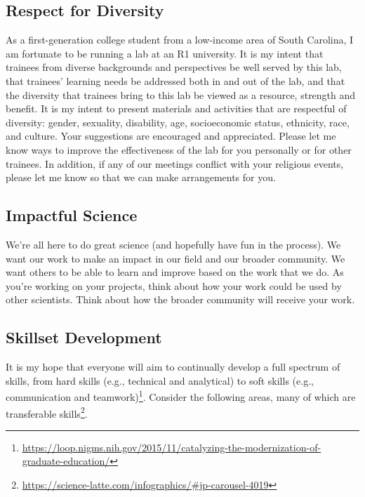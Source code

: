 \documentclass[letterpaper,11pt,oneside]{memoir}
\begin{document}
\subsection{Respect for Diversity}
As a first-generation college student from a low-income area of South Carolina, I am fortunate to be running a lab at an R1 university. It is my intent that trainees from diverse backgrounds and perspectives be well served by this lab, that trainees’ learning needs be addressed both in and out of the lab, and that the diversity that trainees bring to this lab be viewed as a resource, strength and benefit. It is my intent to present materials and activities that are respectful of diversity: gender, sexuality, disability, age, socioeconomic status, ethnicity, race, and culture. Your suggestions are encouraged and appreciated. Please let me know ways to improve the effectiveness of the lab for you personally or for other trainees. In addition, if any of our meetings conflict with your religious events, please let me know so that we can make arrangements for you.

\subsection{Impactful Science}
We're all here to do great science (and hopefully have fun in the process). We want our work to make an impact in our field and our broader community. We want others to be able to learn and improve based on the work that we do. As you're working on your projects, think about how your work could be used by other scientists. Think about how the broader community will receive your work. 

\subsection{Skillset Development}
It is my hope that everyone will aim to continually develop a full spectrum of skills, from hard skills (e.g., technical and analytical) to soft skills (e.g., communication and teamwork)\footnote{\url{https://loop.nigms.nih.gov/2015/11/catalyzing-the-modernization-of-graduate-education/}}. Consider the following areas, many of which are transferable skills\footnote{\url{https://science-latte.com/infographics/\#jp-carousel-4019}}.
\end{document}
